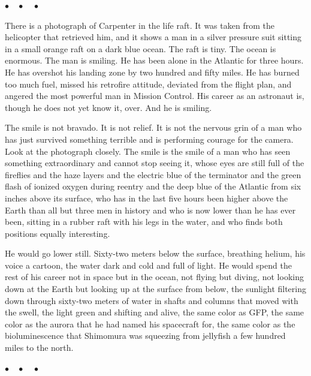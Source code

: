 \documentclass[12pt, letterpaper]{article}
\begin{document}
\begin{center}
$\bullet\quad\bullet\quad\bullet$
\end{center}

There is a photograph of Carpenter in the life raft. It was taken from the helicopter that retrieved him, and it shows a man in a silver pressure suit sitting in a small orange raft on a dark blue ocean. The raft is tiny. The ocean is enormous. The man is smiling. He has been alone in the Atlantic for three hours. He has overshot his landing zone by two hundred and fifty miles. He has burned too much fuel, missed his retrofire attitude, deviated from the flight plan, and angered the most powerful man in Mission Control. His career as an astronaut is, though he does not yet know it, over. And he is smiling.

The smile is not bravado. It is not relief. It is not the nervous grin of a man who has just survived something terrible and is performing courage for the camera. Look at the photograph closely. The smile is the smile of a man who has seen something extraordinary and cannot stop seeing it, whose eyes are still full of the fireflies and the haze layers and the electric blue of the terminator and the green flash of ionized oxygen during reentry and the deep blue of the Atlantic from six inches above its surface, who has in the last five hours been higher above the Earth than all but three men in history and who is now lower than he has ever been, sitting in a rubber raft with his legs in the water, and who finds both positions equally interesting.

He would go lower still. Sixty-two meters below the surface, breathing helium, his voice a cartoon, the water dark and cold and full of light. He would spend the rest of his career not in space but in the ocean, not flying but diving, not looking down at the Earth but looking up at the surface from below, the sunlight filtering down through sixty-two meters of water in shafts and columns that moved with the swell, the light green and shifting and alive, the same color as GFP, the same color as the aurora that he had named his spacecraft for, the same color as the bioluminescence that Shimomura was squeezing from jellyfish a few hundred miles to the north.

\begin{center}
$\bullet\quad\bullet\quad\bullet$
\end{center}
\end{document}

